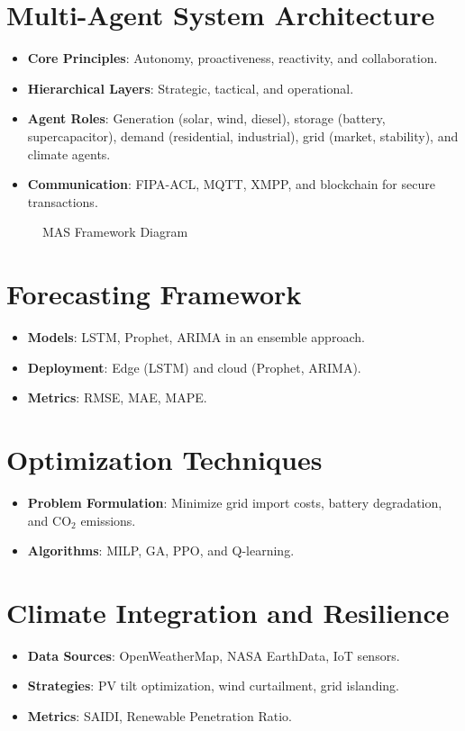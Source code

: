 \documentclass[12pt, a4paper, oneside]{book}
\begin{document}
\section{Multi-Agent System Architecture}
\begin{itemize}
    \item \textbf{Core Principles}: Autonomy, proactiveness, reactivity, and collaboration.
    \item \textbf{Hierarchical Layers}: Strategic, tactical, and operational.
    \item \textbf{Agent Roles}: Generation (solar, wind, diesel), storage (battery, supercapacitor), demand (residential, industrial), grid (market, stability), and climate agents.
    \item \textbf{Communication}: FIPA-ACL, MQTT, XMPP, and blockchain for secure transactions.
\end{itemize}
\begin{figure}[h]
    \centering
    \caption{MAS Framework Diagram}
    \label{fig:mas_framework}
\end{figure}

\section{Forecasting Framework}
\begin{itemize}
    \item \textbf{Models}: LSTM, Prophet, ARIMA in an ensemble approach.
    \item \textbf{Deployment}: Edge (LSTM) and cloud (Prophet, ARIMA).
    \item \textbf{Metrics}: RMSE, MAE, MAPE.
\end{itemize}

\section{Optimization Techniques}
\begin{itemize}
    \item \textbf{Problem Formulation}: Minimize grid import costs, battery degradation, and CO$_2$ emissions.
    \item \textbf{Algorithms}: MILP, GA, PPO, and Q-learning.
\end{itemize}

\section{Climate Integration and Resilience}
\begin{itemize}
    \item \textbf{Data Sources}: OpenWeatherMap, NASA EarthData, IoT sensors.
    \item \textbf{Strategies}: PV tilt optimization, wind curtailment, grid islanding.
    \item \textbf{Metrics}: SAIDI, Renewable Penetration Ratio.
\end{itemize}
\end{document}
